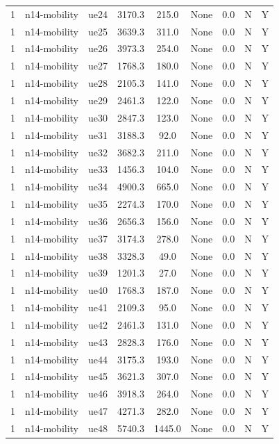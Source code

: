 \begin{table}[ht]
\begin{tabular}{|c|c|c|c|c|c|c|c|c|}
1 & n14-mobility & ue24 & 3170.3 & 215.0 & None & 0.0 & N & Y \\
1 & n14-mobility & ue25 & 3639.3 & 311.0 & None & 0.0 & N & Y \\
1 & n14-mobility & ue26 & 3973.3 & 254.0 & None & 0.0 & N & Y \\
1 & n14-mobility & ue27 & 1768.3 & 180.0 & None & 0.0 & N & Y \\
1 & n14-mobility & ue28 & 2105.3 & 141.0 & None & 0.0 & N & Y \\
1 & n14-mobility & ue29 & 2461.3 & 122.0 & None & 0.0 & N & Y \\
1 & n14-mobility & ue30 & 2847.3 & 123.0 & None & 0.0 & N & Y \\
1 & n14-mobility & ue31 & 3188.3 & 92.0 & None & 0.0 & N & Y \\
1 & n14-mobility & ue32 & 3682.3 & 211.0 & None & 0.0 & N & Y \\
1 & n14-mobility & ue33 & 1456.3 & 104.0 & None & 0.0 & N & Y \\
1 & n14-mobility & ue34 & 4900.3 & 665.0 & None & 0.0 & N & Y \\
1 & n14-mobility & ue35 & 2274.3 & 170.0 & None & 0.0 & N & Y \\
1 & n14-mobility & ue36 & 2656.3 & 156.0 & None & 0.0 & N & Y \\
1 & n14-mobility & ue37 & 3174.3 & 278.0 & None & 0.0 & N & Y \\
1 & n14-mobility & ue38 & 3328.3 & 49.0 & None & 0.0 & N & Y \\
1 & n14-mobility & ue39 & 1201.3 & 27.0 & None & 0.0 & N & Y \\
1 & n14-mobility & ue40 & 1768.3 & 187.0 & None & 0.0 & N & Y \\
1 & n14-mobility & ue41 & 2109.3 & 95.0 & None & 0.0 & N & Y \\
1 & n14-mobility & ue42 & 2461.3 & 131.0 & None & 0.0 & N & Y \\
1 & n14-mobility & ue43 & 2828.3 & 176.0 & None & 0.0 & N & Y \\
1 & n14-mobility & ue44 & 3175.3 & 193.0 & None & 0.0 & N & Y \\
1 & n14-mobility & ue45 & 3621.3 & 307.0 & None & 0.0 & N & Y \\
1 & n14-mobility & ue46 & 3918.3 & 264.0 & None & 0.0 & N & Y \\
1 & n14-mobility & ue47 & 4271.3 & 282.0 & None & 0.0 & N & Y \\
1 & n14-mobility & ue48 & 5740.3 & 1445.0 & None & 0.0 & N & Y \\

\end{tabular}
\end{table}
